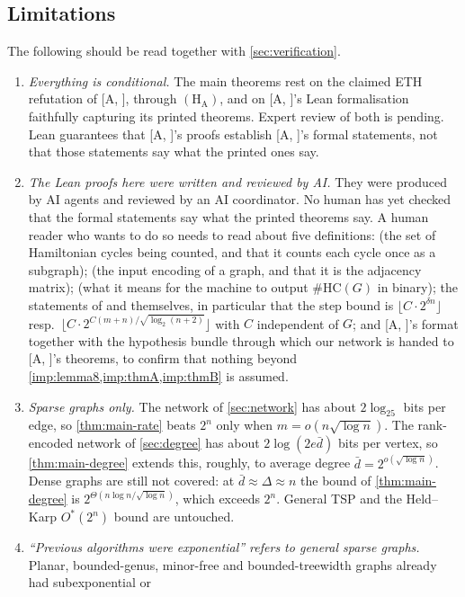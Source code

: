 \documentclass[11pt]{amsart}
\theoremstyle{plain}
\theoremstyle{definition}
\theoremstyle{remark}
\numberwithin{equation}{section}
\newcommand{\A}[1][]{\textup{[A\if\relax\detokenize{#1}\relax\else, #1\fi]}}
\begin{document}
\subsection{Limitations}\label{sec:limitations}
The following should be read together with \cref{sec:verification}.
\begin{enumerate}[label=\textup{(\alph*)}]
\item \emph{Everything is conditional.} The main theorems rest on the claimed ETH refutation
of \A, through $(\mathrm{H}_{\mathrm{A}})$, and on \A's Lean formalisation faithfully capturing
its printed theorems. Expert review of both is pending. Lean guarantees that \A's proofs
establish \A's formal statements, not that those statements say what the printed ones say.
\item \emph{The Lean proofs here were written and reviewed by AI.} They were produced by AI
agents and reviewed by an AI coordinator. No human has yet checked that the formal statements
say what the printed theorems say. A human reader who wants to do so needs to read about five
definitions:  (the set of Hamiltonian cycles being counted, and that it counts
each cycle once as a subgraph);  (the input encoding of a graph, and that
it is the adjacency matrix);  (what it means for the machine to output
$\#\mathrm{HC}(G)$ in binary); the statements of  and  themselves,
in particular that the step bound is $\lfloor C\cdot2^{\delta n}\rfloor$ resp.\
$\lfloor C\cdot2^{C(m+n)/\sqrt{\log_2(n+2)}}\rfloor$ with $C$ independent of $G$; and \A's
\lean{Net} format together with the hypothesis bundle through which our network is handed to
\A's theorems, to confirm that nothing beyond \cref{imp:lemma8,imp:thmA,imp:thmB} is assumed.
\item \emph{Sparse graphs only.} The network of \cref{sec:network} has about $2\log_25$ bits per
edge, so \cref{thm:main-rate} beats $2^n$ only when $m=o(n\sqrt{\log n})$. The rank-encoded
network of \cref{sec:degree} has about $2\log(2e\bar d)$ bits per vertex, so
\cref{thm:main-degree} extends this, roughly, to average degree $\bar d=2^{o(\sqrt{\log n})}$. Dense
graphs are still not covered: at $\bar d\approx\Delta\approx n$ the bound of
\cref{thm:main-degree} is $2^{\Theta(n\log n/\sqrt{\log n})}$, which exceeds $2^n$. General TSP
and the Held--Karp $O^*(2^n)$ bound are untouched.
\item \emph{``Previous algorithms were exponential'' refers to general sparse graphs.} Planar,
bounded-genus, minor-free and bounded-treewidth graphs already had subexponential or

\end{enumerate}
\end{document}
